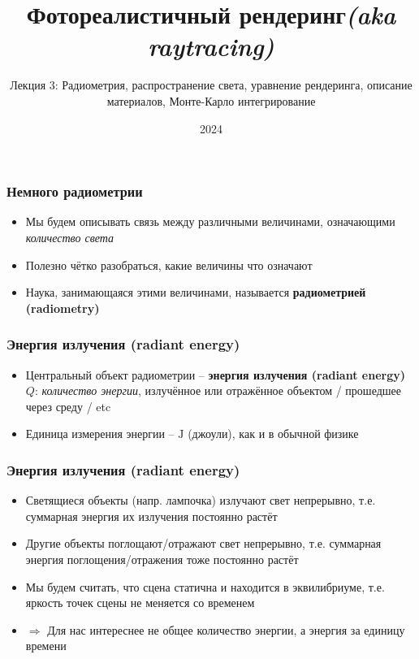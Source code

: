 \documentclass[10pt]{beamer}
\title{Фотореалистичный рендеринг\quad\quad\quad\quad\quad\quad \textit{(aka raytracing)}}
\subtitle{Лекция 3: Радиометрия, распространение света, уравнение рендеринга, описание материалов, Монте-Карло интегрирование}
\date{2024}
\begin{document}
\frame{\titlepage}

\begin{frame}
\frametitle{Немного радиометрии}
\begin{itemize}
\item Мы будем описывать связь между различными величинами, означающими \textit{количество света}
\pause
\item Полезно чётко разобраться, какие величины что означают
\pause
\item Наука, занимающаяся этими величинами, называется \textbf{радиометрией (radiometry)} 
\end{itemize}
\end{frame}

\begin{frame}
\frametitle{Энергия излучения (radiant energy)}
\begin{itemize}
\item Центральный объект радиометрии -- \textbf{энергия излучения (radiant energy)} \begin{math}Q\end{math}: \textit{количество энергии}, излучённое или отражённое объектом / прошедшее через среду / etc
\pause
\item Единица измерения энергии -- \begin{math}\text{J}\end{math} (джоули), как и в обычной физике
\end{itemize}
\end{frame}

\begin{frame}
\frametitle{Энергия излучения (radiant energy)}
\begin{itemize}
\item Светящиеся объекты (напр. лампочка) излучают свет непрерывно, т.е. суммарная энергия их излучения постоянно растёт
\pause
\item Другие объекты поглощают/отражают свет непрерывно, т.е. суммарная энергия поглощения/отражения тоже постоянно растёт
\pause
\item Мы будем считать, что сцена статична и находится в эквилибриуме, т.е. яркость точек сцены не меняется со временем
\pause
\item \begin{math}\Longrightarrow\end{math} Для нас интереснее не общее количество энергии, а энергия за единицу времени
\end{itemize}
\end{frame}
\end{document}
